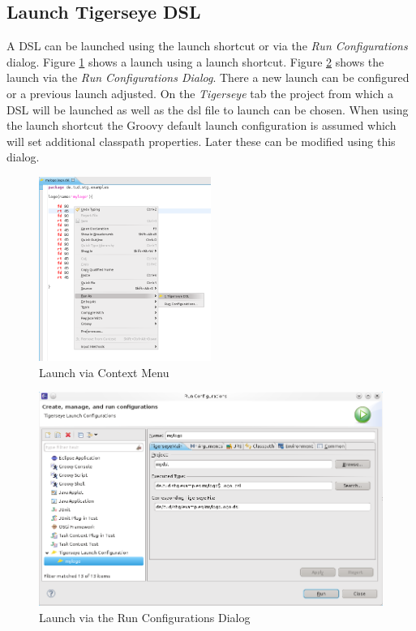 	
	\subsection{Launch Tigerseye DSL}
	  A  DSL can be launched using the launch shortcut or via the \textit{Run Configurations} dialog. Figure \ref{fig:launch_shortcut} shows a launch using a launch shortcut. Figure  \ref{fig:launch_run_configurations_dialog} shows the launch via the \emph{Run Configurations Dialog}. There a new launch can be configured or a previous launch adjusted. On the \emph{Tigerseye} tab the project from which a DSL will be launched as well as the dsl file to launch can be chosen. When using the launch shortcut the Groovy default launch configuration is assumed which will set additional classpath properties. Later these can be modified using this dialog.
	
	\begin{figure}
	  \centering
	  \includegraphics[width=0.5\textwidth]{./pics/launch_shortcut.png}
	  \caption{Launch via Context Menu}
	  \label{fig:launch_shortcut}
	\end{figure}

	\begin{figure}
	  \centering
	  \includegraphics[width=.5\textwidth]{./pics/launch_run_configurations_dialog.png}
	  \caption{Launch via the Run Configurations Dialog}
	  \label{fig:launch_run_configurations_dialog}
	\end{figure}
 
